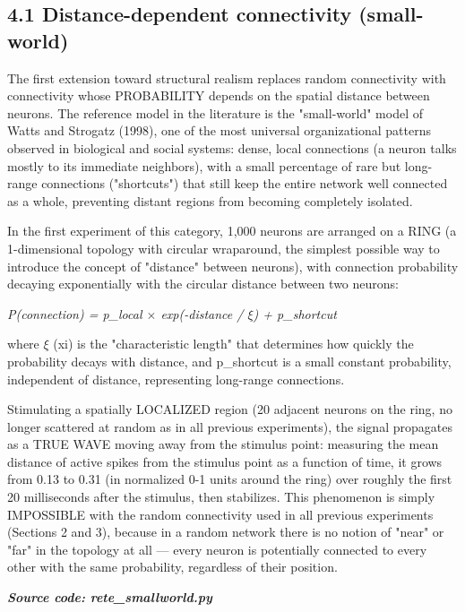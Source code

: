 \documentclass[
  english,
]{article}
\begin{document}
\subsection{4.1 Distance-dependent connectivity (small-world)}\label{distance-dependent-connectivity-small-world}

The first extension toward structural realism replaces random connectivity with connectivity whose PROBABILITY depends on the spatial distance between neurons. The reference model in the literature is the "small-world" model of Watts and Strogatz (1998), one of the most universal organizational patterns observed in biological and social systems: dense, local connections (a neuron talks mostly to its immediate neighbors), with a small percentage of rare but long-range connections ("shortcuts") that still keep the entire network well connected as a whole, preventing distant regions from becoming completely isolated.

In the first experiment of this category, 1,000 neurons are arranged on a RING (a 1-dimensional topology with circular wraparound, the simplest possible way to introduce the concept of "distance" between neurons), with connection probability decaying exponentially with the circular distance between two neurons:

\emph{P(connection) = p\_\allowbreak{}local $\times$ exp(-distance / $\xi$) + p\_\allowbreak{}shortcut}

where $\xi$ (xi) is the "characteristic length" that determines how quickly the probability decays with distance, and p\_\allowbreak{}shortcut is a small constant probability, independent of distance, representing long-range connections.

Stimulating a spatially LOCALIZED region (20 adjacent neurons on the ring, no longer scattered at random as in all previous experiments), the signal propagates as a TRUE WAVE moving away from the stimulus point: measuring the mean distance of active spikes from the stimulus point as a function of time, it grows from 0.13 to 0.31 (in normalized 0-1 units around the ring) over roughly the first 20 milliseconds after the stimulus, then stabilizes. This phenomenon is simply IMPOSSIBLE with the random connectivity used in all previous experiments (Sections 2 and 3), because in a random network there is no notion of "near" or "far" in the topology at all --- every neuron is potentially connected to every other with the same probability, regardless of their position.

\textit{\textbf{Source code: rete\_\allowbreak{}smallworld.py}}
\end{document}
